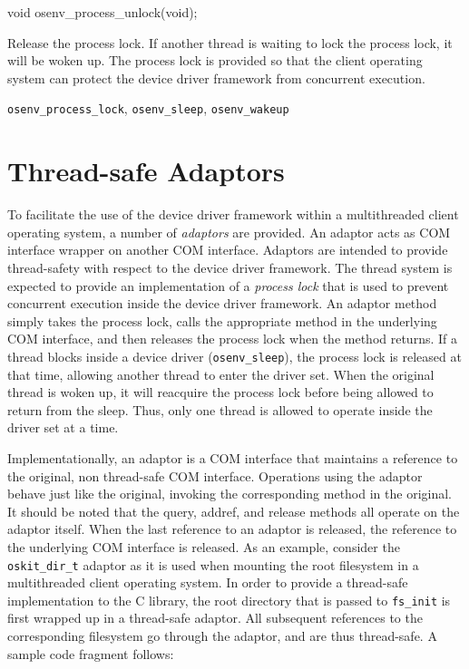 \begin{apisyn}

	\funcproto void osenv_process_unlock(void);
\end{apisyn}
\begin{apidesc}
	Release the process lock. If another thread is waiting to lock the
	process lock, it will be woken up. The process lock is provided so
	that the client operating system can protect the device driver
	framework from concurrent execution.
\end{apidesc}
\begin{apirel}
	{\tt osenv_process_lock}, {\tt osenv_sleep}, {\tt osenv_wakeup}
\end{apirel}


\section{Thread-safe Adaptors}
\label{pthread-wrappers}

To facilitate the use of the device driver framework within a multithreaded
client operating system, a number of \emph{adaptors} are provided. An
adaptor acts as COM interface wrapper on another COM interface. Adaptors
are intended to provide thread-safety with respect to the device driver
framework. The thread system is expected to provide an implementation of a
\emph{process lock} that is used to prevent concurrent execution inside the
device driver framework. An adaptor method simply takes the process lock,
calls the appropriate method in the underlying COM interface, and then
releases the process lock when the method returns. If a thread blocks
inside a device driver ({\tt osenv_sleep}), the process lock is
released at that time, allowing another thread to enter the driver set.
When the original thread is woken up, it will reacquire the process lock
before being allowed to return from the sleep. Thus, only one thread is
allowed to operate inside the driver set at a time.

Implementationally, an adaptor is a COM interface that maintains a
reference to the original, non thread-safe COM interface. Operations using
the adaptor behave just like the original, invoking the corresponding
method in the original. It should be noted that the query, addref, and
release methods all operate on the adaptor itself. When the last reference
to an adaptor is released, the reference to the underlying COM interface is
released. As an example, consider the {\tt oskit_dir_t} adaptor as it is
used when mounting the root filesystem in a multithreaded client operating
system. In order to provide a thread-safe implementation to the C library,
the root directory that is passed to {\tt fs_init} is first wrapped up in a
thread-safe adaptor. All subsequent references to the corresponding
filesystem go through the adaptor, and are thus thread-safe. A sample code
fragment follows:

